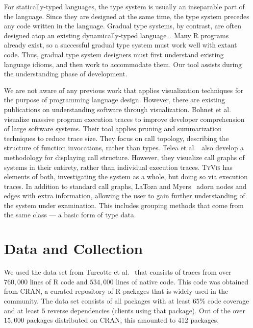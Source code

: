 \documentclass{vgtc}                          %
\newcommand{\ourmethodplaintext}{\textsc{TyVis}\xspace}
\newcommand{\ourmethod}{{\sc \ourmethodplaintext}\xspace}
\newcommand{\pkgNumAnalyzed}{412\xspace}
\begin{document}
For statically-typed languages, the type system is usually an inseparable part of the language.
Since they are designed at the same time, the type system precedes any code written in the language.
Gradual type systems, by contrast, are often designed atop an existing dynamically-typed language~\cite{tobin-hochstadt:2016}.
Many R programs already exist, so a successful gradual type system must work well with extant code.
Thus, gradual type system designers must first understand existing language idioms, and then work to accommodate them.
Our tool assists during the understanding phase of development.

We are not aware of any previous work that applies visualization techniques for the purpose of programming language design.
However, there are existing publications on understanding software through visualization.
Bohnet et al.~\cite{bohnet:2009} visualize massive program execution traces to improve developer comprehension of large software systems.
Their tool applies pruning and summarization techniques to reduce trace size.
They focus on call topology, describing the structure of function invocations, rather than types.
Telea et al.~\cite{telea:2009} also develop a methodology for displaying call structure.
However, they visualize call graphs of systems in their entirety, rather than individual execution traces.
\ourmethod has elements of both, investigating the system as a whole, but doing so via execution traces.
In addition to standard call graphs, LaToza and Myers~\cite{latoza:2011} adorn nodes and edges with extra information, allowing the user to gain further understanding of the system under examination.
This includes grouping methods that come from the same class --- a basic form of type data.


\section{Data and Collection} \label{sec:data}

We used the data set from Turcotte et al.~\cite{turcotte:2020} that consists of traces from over $760,000$ lines of R code and $534,000$ lines of native code.
This code was obtained from CRAN, a curated repository of R packages that is widely used in the community.
The data set consists of all packages with at least $65\%$ code coverage and at least $5$ reverse dependencies (clients using that package).
Out of the over $15,000$ packages distributed on CRAN, this amounted to \pkgNumAnalyzed packages.
\end{document}
